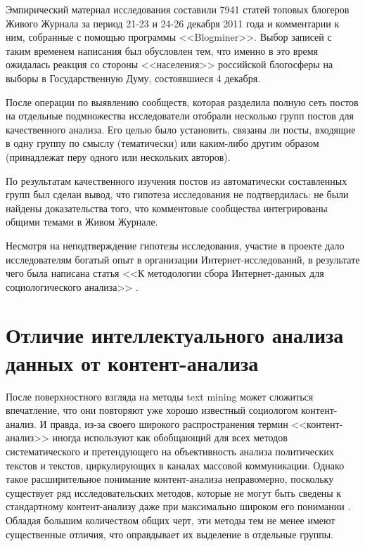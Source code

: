 Эмпирический материал исследования составили 7941 статей топовых блогеров Живого Журнала за период 21-23 и 24-26 декабря 2011 года и комментарии к ним, собранные с помощью программы <<Blogminer>>. Выбор записей с таким временем написания был обусловлен тем, что именно в это время ожидалась реакция со стороны <<населения>> российской блогосферы на выборы в Государственную Думу, состоявшиеся 4 декабря.


После операции по выявлению сообществ, которая разделила полную сеть постов на отдельные подмножества исследователи отобрали несколько групп постов для качественного анализа. Его целью было установить, связаны ли посты, входящие в одну группу по смыслу (тематически) или каким-либо другим образом (принадлежат перу одного или нескольких авторов).

По результатам качественного изучения постов из автоматически составленных групп был сделан вывод, что гипотеза исследования не подтвердилась: не были найдены доказательства того, что комментовые сообщества интегрированы общими темами в Живом Журнале.

Несмотря на неподтверждение гипотезы исследования, участие в проекте дало исследователям богатый опыт в организации Интернет-исследований, в результате чего была написана статья <<К методологии сбора Интернет-данных для социологического анализа>> \cite{methodlogy_internet}.

\section{Отличие интеллектуального анализа данных от контент-анализа}

После поверхностного взгляда на методы text mining может сложиться впечатление, что они повторяют уже хорошо известный социологом контент-анализ. И правда, из-за своего широкого распространения термин <<контент-анализ>> иногда используют как обобщающий для всех методов систематического и претендующего на объективность анализа политических текстов и текстов, циркулирующих в каналах массовой коммуникации. Однако такое расширительное понимание контент-анализа неправомерно, поскольку существует ряд исследовательских методов, которые не могут быть сведены к стандартному контент-анализу даже при максимально широком его понимании \cite{Iudin2010}. Обладая большим количеством общих черт, эти методы тем не менее имеют существенные отличия, что оправдывает их выделение в отдельные группы.

